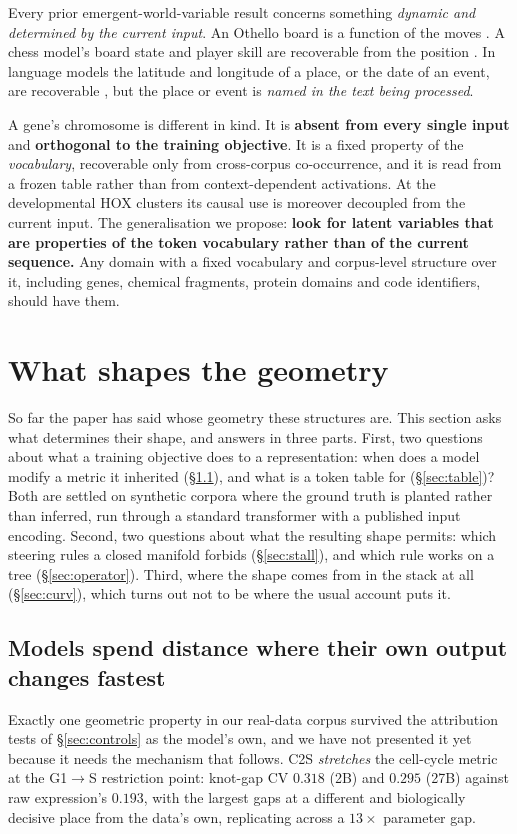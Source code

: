 \documentclass[11pt]{article}
\begin{document}
Every prior emergent-world-variable result concerns something \emph{dynamic and determined by the
current input}. An Othello board is a function of the moves \citep{li2023othello,nanda2023linear}. A
chess model's board state and player skill are recoverable from the position
\citep{karvonen2024chess,jenner2024lookahead}. In language models the latitude and longitude of a
place, or the date of an event, are recoverable \citep{gurnee2024spacetime}, but the place or event is
\emph{named in the text being processed}.

A gene's chromosome is different in kind. It is \textbf{absent from every single input} and
\textbf{orthogonal to the training objective}. It is a fixed property of the \emph{vocabulary},
recoverable only from cross-corpus co-occurrence, and it is read from a frozen table rather than from
context-dependent activations. At the developmental HOX clusters its causal use is moreover decoupled
from the current input. The generalisation we propose: \textbf{look for latent variables that are
properties of the token vocabulary rather than of the current sequence.} Any domain with a fixed
vocabulary and corpus-level structure over it, including genes, chemical fragments, protein domains and
code identifiers, should have them.

\section{What shapes the geometry}\label{sec:shape}

So far the paper has said whose geometry these structures are. This section asks what determines their
shape, and answers in three parts. First, two questions about what a training objective does to a
representation: when does a model modify a metric it inherited (\S\ref{sec:warp}), and what is a token
table for (\S\ref{sec:table})? Both are settled on synthetic corpora where the ground truth is planted
rather than inferred, run through a standard transformer with a published input encoding. Second, two
questions about what the resulting shape permits: which steering rules a closed manifold forbids
(\S\ref{sec:stall}), and which rule works on a tree (\S\ref{sec:operator}). Third, where the shape
comes from in the stack at all (\S\ref{sec:curv}), which turns out not to be where the usual account
puts it.

\subsection{Models spend distance where their own output changes fastest}\label{sec:warp}
Exactly one geometric property in our real-data corpus survived the attribution tests of
\S\ref{sec:controls} as the model's own, and we have not presented it yet because it needs the
mechanism that follows. C2S \emph{stretches} the cell-cycle metric at the G1$\to$S restriction point: knot-gap CV $0.318$ (2B) and
$0.295$ (27B) against raw expression's $0.193$, with the largest gaps at a different and biologically
decisive place from the data's own, replicating across a $13\times$ parameter gap.
\end{document}
